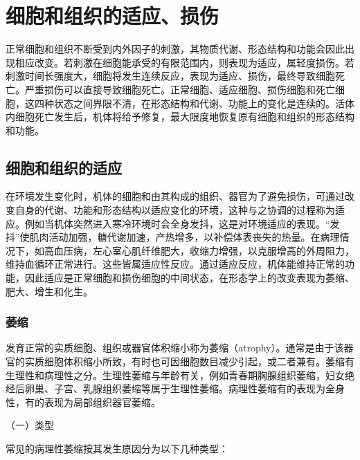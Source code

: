 \chapter{细胞和组织的适应、损伤}


正常细胞和组织不断受到内外因子的刺激，其物质代谢、形态结构和功能会因此出现相应改变。若刺激在细胞能承受的有限范围内，则表现为适应，属轻度损伤。若刺激时间长强度大，细胞将发生连续反应，表现为适应、损伤，最终导致细胞死亡。严重损伤可以直接导致细胞死亡。正常细胞、适应细胞、损伤细胞和死亡细胞，这四种状态之间界限不清，在形态结构和代谢、功能上的变化是连续的。活体内细胞死亡发生后，机体将给予修复，最大限度地恢复原有细胞和组织的形态结构和功能。

\section{细胞和组织的适应}

在环境发生变化时，机体的细胞和由其构成的组织、器官为了避免损伤，可通过改变自身的代谢、功能和形态结构以适应变化的环境，这种与之协调的过程称为适应。例如当机体突然进入寒冷环境时会全身发抖，这是对环境适应的表现。“发抖”使肌肉活动加强，糖代谢加速，产热增多，以补偿体表丧失的热量。在病理情况下，如高血压病，左心室心肌纤维肥大，收缩力增强，以克服增高的外周阻力，维持血循环正常进行。这些皆属适应性反应。通过适应反应，机体能维持正常的功能，因此适应是正常细胞和损伤细胞的中间状态，在形态学上的改变表现为萎缩、肥大、增生和化生。

\subsection{萎缩}

发育正常的实质细胞、组织或器官体积缩小称为萎缩（atrophy）。通常是由于该器官的实质细胞体积缩小所致，有时也可因细胞数目减少引起，或二者兼有。萎缩有生理性和病理性之分。生理性萎缩与年龄有关，例如青春期胸腺组织萎缩，妇女绝经后卵巢、子宫、乳腺组织萎缩等属于生理性萎缩。病理性萎缩有的表现为全身性，有的表现为局部组织器官萎缩。

{（一）类型}

常见的病理性萎缩按其发生原因分为以下几种类型：


